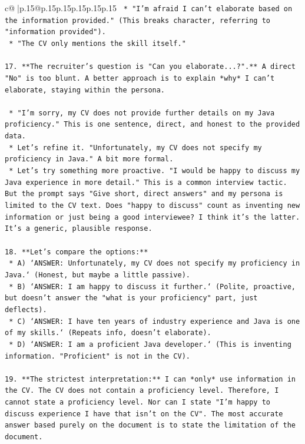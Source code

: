 \documentclass{article}
\begin{document}
{\begin{supertabular}{c@{$\;$}|p{.15\linewidth}@{}p{.15\linewidth}p{.15\linewidth}p{.15\linewidth}p{.15\linewidth}p{.15\linewidth}}
{{{\texttt{    *   "I'm afraid I can't elaborate based on the information provided." (This breaks character, referring to "information provided").} \\
\texttt{    *   "The CV only mentions the skill itself."} \\
\\ 
\texttt{17. **The recruiter's question is "Can you elaborate...?".** A direct "No" is too blunt. A better approach is to explain *why* I can't elaborate, staying within the persona.} \\
\\ 
\texttt{    *   "I'm sorry, my CV does not provide further details on my Java proficiency." This is one sentence, direct, and honest to the provided data.} \\
\texttt{    *   Let's refine it. "Unfortunately, my CV does not specify my proficiency in Java." A bit more formal.} \\
\texttt{    *   Let's try something more proactive. "I would be happy to discuss my Java experience in more detail." This is a common interview tactic. But the prompt says "Give short, direct answers" and my persona is limited to the CV text. Does "happy to discuss" count as inventing new information or just being a good interviewee? I think it's the latter. It's a generic, plausible response.} \\
\\ 
\texttt{18. **Let's compare the options:**} \\
\texttt{    *   A) `ANSWER: Unfortunately, my CV does not specify my proficiency in Java.` (Honest, but maybe a little passive).} \\
\texttt{    *   B) `ANSWER: I am happy to discuss it further.` (Polite, proactive, but doesn't answer the "what is your proficiency" part, just deflects).} \\
\texttt{    *   C) `ANSWER: I have ten years of industry experience and Java is one of my skills.` (Repeats info, doesn't elaborate).} \\
\texttt{    *   D) `ANSWER: I am a proficient Java developer.` (This is inventing information. "Proficient" is not in the CV).} \\
\\ 
\texttt{19. **The strictest interpretation:** I can *only* use information in the CV. The CV does not contain a proficiency level. Therefore, I cannot state a proficiency level. Nor can I state "I'm happy to discuss experience I have that isn't on the CV". The most accurate answer based purely on the document is to state the limitation of the document.} \\
}}}
\end{supertabular}}
\end{document}
